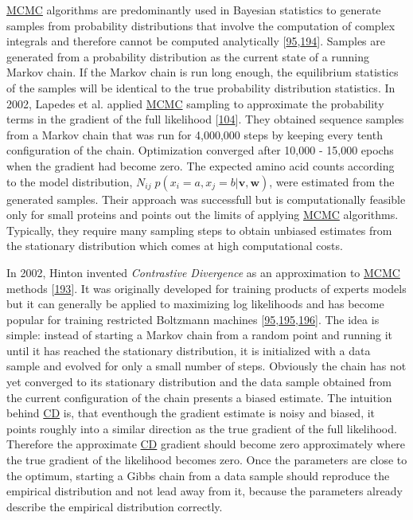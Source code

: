 \documentclass[11pt,a4paper,twoside]{book}
\newcommand{\eq}{\!=\!}
\renewcommand{\v}{\mathbf{v}}
\newcommand{\w}{\mathbf{w}}
\theoremstyle{definition}
\theoremstyle{definition}
\theoremstyle{remark}
\begin{document}
\protect\hyperlink{abbrev}{MCMC} algorithms are predominantly used in
Bayesian statistics to generate samples from probability distributions
that involve the computation of complex integrals and therefore cannot
be computed analytically
{[}\protect\hyperlink{ref-Murphy2012}{95},\protect\hyperlink{ref-Andrieu2003}{194}{]}.
Samples are generated from a probability distribution as the current
state of a running Markov chain. If the Markov chain is run long enough,
the equilibrium statistics of the samples will be identical to the true
probability distribution statistics. In 2002, Lapedes et al. applied
\protect\hyperlink{abbrev}{MCMC} sampling to approximate the probability
terms in the gradient of the full likelihood
{[}\protect\hyperlink{ref-Lapedes2012a}{104}{]}. They obtained sequence
samples from a Markov chain that was run for 4,000,000 steps by keeping
every tenth configuration of the chain. Optimization converged after
10,000 - 15,000 epochs when the gradient had become zero. The expected
amino acid counts according to the model distribution,
\(N_{ij} \; p(x_i \eq a, x_j \eq b | \v,\w)\), were estimated from the
generated samples. Their approach was successfull but is computationally
feasible only for small proteins and points out the limits of applying
\protect\hyperlink{abbrev}{MCMC} algorithms. Typically, they require
many sampling steps to obtain unbiased estimates from the stationary
distribution which comes at high computational costs.

In 2002, Hinton invented \emph{Contrastive Divergence} as an
approximation to \protect\hyperlink{abbrev}{MCMC} methods
{[}\protect\hyperlink{ref-Hinton2002}{193}{]}. It was originally
developed for training products of experts models but it can generally
be applied to maximizing log likelihoods and has become popular for
training restricted Boltzmann machines
{[}\protect\hyperlink{ref-Murphy2012}{95},\protect\hyperlink{ref-Fischer2012}{195},\protect\hyperlink{ref-Bengio2009}{196}{]}.
The idea is simple: instead of starting a Markov chain from a random
point and running it until it has reached the stationary distribution,
it is initialized with a data sample and evolved for only a small number
of steps. Obviously the chain has not yet converged to its stationary
distribution and the data sample obtained from the current configuration
of the chain presents a biased estimate. The intuition behind
\protect\hyperlink{abbrev}{CD} is, that eventhough the gradient estimate
is noisy and biased, it points roughly into a similar direction as the
true gradient of the full likelihood. Therefore the approximate
\protect\hyperlink{abbrev}{CD} gradient should become zero approximately
where the true gradient of the likelihood becomes zero. Once the
parameters are close to the optimum, starting a Gibbs chain from a data
sample should reproduce the empirical distribution and not lead away
from it, because the parameters already describe the empirical
distribution correctly.
\end{document}
